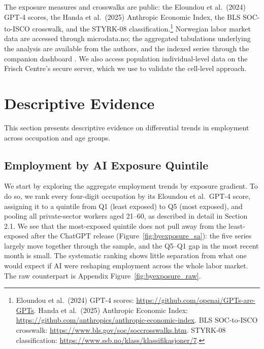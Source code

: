 \documentclass[12pt]{article}
\begin{document}
The exposure measures and crosswalks are public: the Eloundou et al.\ (2024) GPT-4 scores, the Handa et al.\ (2025) Anthropic Economic Index, the BLS SOC-to-ISCO crosswalk, and the STYRK-08 classification.\footnote{Eloundou et al.\ (2024) GPT-4 scores: \url{https://github.com/openai/GPTs-are-GPTs}. Handa et al.\ (2025) Anthropic Economic Index: \url{https://github.com/anthropics/anthropic-economic-index}. BLS SOC-to-ISCO crosswalk: \url{https://www.bls.gov/soc/soccrosswalks.htm}. STYRK-08 classification: \url{https://www.ssb.no/klass/klassifikasjoner/7}.} Norwegian labor market data are accessed through microdata.no; the aggregated tabulations underlying the analysis are available from the authors, and the indexed series through the companion dashboard \citep{kiindeksen2026}. We also access population individual-level data on the Frisch Centre's secure server, which we use to validate the cell-level approach. 




\section{Descriptive Evidence}\label{sec:results}
This section presents descriptive evidence on differential trends in employment across occupation and age groups.

\subsection{Employment by AI Exposure Quintile}\label{sec:results:quintiles}

We start by exploring the aggregate employment trends by exposure gradient. To do so, we rank every four-digit occupation by its Eloundou et al.\ GPT-4 score, assigning it to a quintile from Q1 (least exposed) to Q5 (most exposed), and pooling all private-sector workers aged 21--60, as described in detail in Section 2.1. We see that the most-exposed quintile does not pull away from the least-exposed after the ChatGPT release (Figure~\ref{fig:byexposure_sa}): the five series largely move together through the sample, and the Q5--Q1 gap in the most recent month is small. The systematic ranking shows little separation from what one would expect if AI were reshaping employment across the whole labor market. The raw counterpart is Appendix Figure~\ref{fig:byexposure_raw}.
\end{document}
